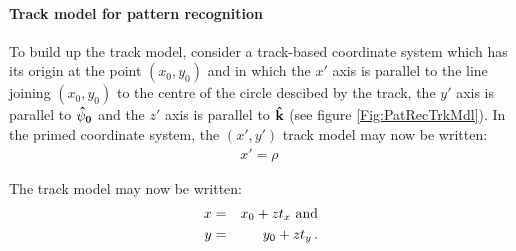 \paragraph{Track model for pattern recognition}

To build up the track model, consider a track-based coordinate system
which has its origin at the point $(x_0, y_0)$ and in which the
$x'$ axis is parallel to the line joining $(x_0, y_0)$ to the
centre of the circle descibed by the track, the $y'$ axis is parallel
to ${\bf \hat{\psi}_0}$ and the $z'$ axis is parallel to 
${\bf \hat{k}}$ (see figure \ref{Fig:PatRecTrkMdl}).
In the primed coordinate system, the $(x', y')$ track model may now be
written: 
\begin{eqnarray}
  x' = \rho \
\end{eqnarray}

The track model may now be written:
\begin{eqnarray}
  x & = & x_0 + z t_x {\rm~and} \\
  y & = & y_0 + z t_y \,.
\end{eqnarray}


